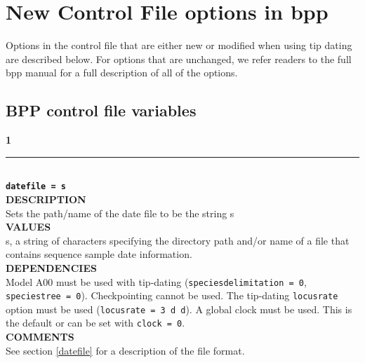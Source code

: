 \documentclass[11pt]{article}
\begin{document}
\maketitle


\section{New Control File options in bpp}\label{control}
Options in the control file that are either new or modified when using tip dating are described below.
For options that are unchanged, we refer readers to the full bpp manual for a full description of all of the options.
\medskip\newline
\subsection{BPP control file variables} \label{controlfilevariables}
\textbf{{\large 1}} \\
\noindent\rule{\textwidth}{0.8pt} \\
\textbf{{\Large \texttt{datefile = s}}} \vspace{5pt}\\
\textbf{DESCRIPTION} \vspace{5pt}\\
Sets the path/name of the date file to be the string s\vspace{5pt}\\
\textbf{VALUES} \vspace{5pt}\\
s, a string of characters specifying the directory path and/or name of a file that contains sequence sample date information.\vspace{10pt}\\
\textbf{DEPENDENCIES} \vspace{5pt}\\
Model A00 must be used with tip-dating (\texttt{speciesdelimitation = 0}, \texttt{speciestree = 0}).
Checkpointing cannot be used. 
The tip-dating \texttt{locusrate} option must be used (\texttt{locusrate = 3 d d}). 
A global clock must be used. This is the default or can be set with \texttt{clock = 0}. \vspace{5pt}\\
\textbf{COMMENTS} \vspace{5pt}\\
See section \ref{datefile} for a description of the file format.
 \vspace{5pt}\\
\end{document}
